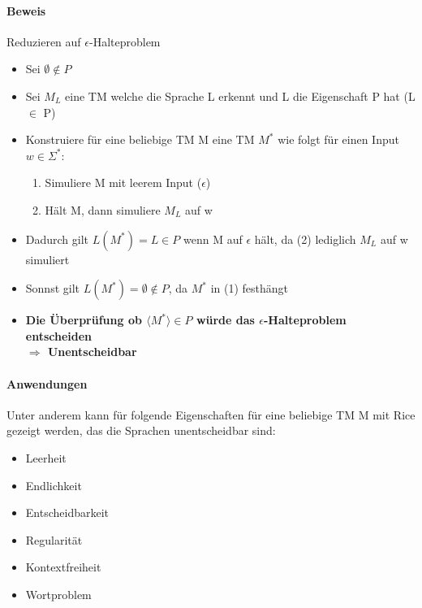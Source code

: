 \documentclass[12pt,a4paper]{article}
\begin{document}
\paragraph{Beweis}
\flushleft
Reduzieren auf $\epsilon$-Halteproblem
\begin{itemize}
\item Sei $\emptyset \not\in P$
\item Sei $M_L$ eine TM welche die Sprache L erkennt und L die Eigenschaft P hat (L $\in$ P)
\item Konstruiere für eine beliebige TM M eine TM $M^*$ wie folgt für einen Input $w\in \Sigma^*$:
\begin{enumerate}

\item Simuliere M mit leerem Input ($\epsilon$)
\item Hält M, dann simuliere $M_L$ auf w
\end{enumerate}
\item Dadurch gilt $L(M^*) = L \in P$ wenn M auf $\epsilon$ hält, da (2) lediglich $M_L$ auf w simuliert
\item Sonnst gilt $L(M^*) = \emptyset \not\in P$, da $M^*$ in (1) festhängt
\item \textbf{Die Überprüfung ob $\langle M^* \rangle \in P$ würde das $\epsilon$-Halteproblem entscheiden\\
$\Rightarrow$ Unentscheidbar}
\end{itemize}

\paragraph{Anwendungen}
\flushleft
Unter anderem kann für folgende Eigenschaften für eine beliebige TM M mit Rice gezeigt werden, das die Sprachen unentscheidbar sind:
\begin{itemize}
\item Leerheit
\item Endlichkeit
\item Entscheidbarkeit
\item Regularität
\item Kontextfreiheit
\item Wortproblem
\end{itemize}
\end{document}
